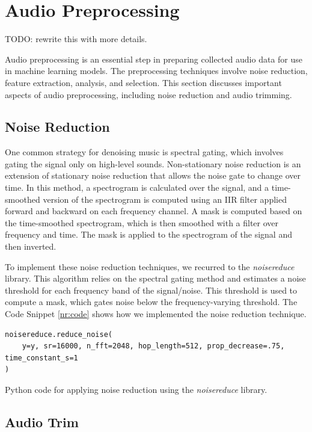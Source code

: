 \section{Audio Preprocessing}
TODO: rewrite this with more details.

Audio preprocessing is an essential step in preparing collected audio data for use in machine learning models. The preprocessing techniques involve noise reduction, feature extraction, analysis, and selection. This section discusses important aspects of audio preprocessing, including noise reduction and audio trimming.

\subsection{Noise Reduction}

One common strategy for denoising music is spectral gating, which involves gating the signal only on high-level sounds. Non-stationary noise reduction is an extension of stationary noise reduction that allows the noise gate to change over time. In this method, a spectrogram is calculated over the signal, and a time-smoothed version of the spectrogram is computed using an IIR filter applied forward and backward on each frequency channel. A mask is computed based on the time-smoothed spectrogram, which is then smoothed with a filter over frequency and time. The mask is applied to the spectrogram of the signal and then inverted.

To implement these noise reduction techniques, we recurred to the \textit{noisereduce} library. This algorithm relies on the spectral gating method and estimates a noise threshold for each frequency band of the signal/noise. This threshold is used to compute a mask, which gates noise below the frequency-varying threshold. The Code Snippet \ref{nr:code} shows how we implemented the noise reduction technique.

\begin{listing}[H]
	\begin{verbatim}
noisereduce.reduce_noise(
	y=y, sr=16000, n_fft=2048, hop_length=512, prop_decrease=.75, time_constant_s=1
)
	\end{verbatim}
	\caption{Python code for applying noise reduction using the \textit{noisereduce} library.}
	\label{nr:code}
\end{listing}


\subsection{Audio Trim}


